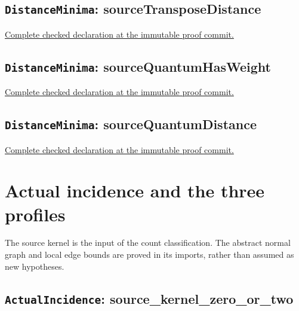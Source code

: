 \subsection*{\texttt{DistanceMinima}: sourceTransposeDistance}

\noindent\href{https://github.com/alectionary/vibe-math/blob/3ae21c0719cedbd928f4f7882f9b9e266567605e/formalization/distance-preservation/truncated12/DistanceMinima.lean#L37-L38}{Complete checked declaration at the immutable proof commit.}



\subsection*{\texttt{DistanceMinima}: sourceQuantumHasWeight}

\noindent\href{https://github.com/alectionary/vibe-math/blob/3ae21c0719cedbd928f4f7882f9b9e266567605e/formalization/distance-preservation/truncated12/DistanceMinima.lean#L60-L65}{Complete checked declaration at the immutable proof commit.}



\subsection*{\texttt{DistanceMinima}: sourceQuantumDistance}

\noindent\href{https://github.com/alectionary/vibe-math/blob/3ae21c0719cedbd928f4f7882f9b9e266567605e/formalization/distance-preservation/truncated12/DistanceMinima.lean#L70-L71}{Complete checked declaration at the immutable proof commit.}



\clearpage\section{Actual incidence and the three profiles}

The source kernel is the input of the count classification. The abstract normal graph and local edge bounds are proved in its imports, rather than assumed as new hypotheses.

\subsection*{\texttt{ActualIncidence}: source\_kernel\_zero\_or\_two}

